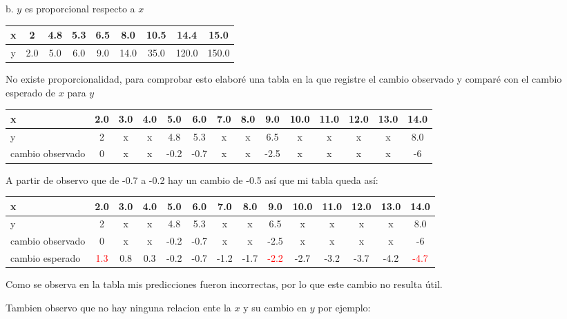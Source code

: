 \documentclass[12pt, letterpaper]{article}
\begin{document}
\newpage
b. $y$ es proporcional respecto a $x$

\begin{tabular}{c|c|c|c|c|c|c|c|c}
x & 2 & 4.8 & 5.3 & 6.5 & 8.0 & 10.5 & 14.4 & 15.0\\
\hline
y & 2.0 & 5.0 & 6.0 & 9.0 & 14.0 & 35.0 & 120.0 & 150.0 
\end{tabular}

No existe proporcionalidad, para comprobar esto elaboré una tabla en la que registre el cambio observado y comparé con el cambio esperado de $x$ para $y$
\newpage
\begin{table}[htb]
\centering
\begin{tabular}{|p{1.2cm}|c|c|c|c|c|c|c|c|c|c|c|c|c|}
\hline
x & 2.0 & 3.0 & 4.0 & 5.0 & 6.0 & 7.0 & 8.0 & 9.0 & 10.0 & 11.0 & 12.0 & 13.0 & 14.0\\
\hline
y & 2    & x   &  x   & 4.8 & 5.3 &   x &    x & 6.5 &   x   &  x    &  x    &   x    & 8.0\\
\hline
cambio observado & 0    & x   &  x   & -0.2 & -0.7 &   x &    x & -2.5 &   x   &  x    &  x    &   x    & -6\\
\hline
\end{tabular}
\end{table}
A partir de observo que de -0.7 a -0.2 hay un cambio de -0.5 así que mi  tabla queda así:

\begin{table}[htb]
\centering
\begin{tabular}{|p{1.2cm}|c|c|c|c|c|c|c|c|c|c|c|c|c|}
\hline
x & 2.0 & 3.0 & 4.0 & 5.0 & 6.0 & 7.0 & 8.0 & 9.0 & 10.0 & 11.0 & 12.0 & 13.0 & 14.0\\
\hline
y & 2    & x   &  x   & 4.8 & 5.3 &   x &    x & 6.5 &   x   &  x    &  x    &   x    & 8.0\\
\hline
cambio observado & 0    & x   &  x   & -0.2 & -0.7 &   x &    x & -2.5 &   x   &  x    &  x    &   x    & -6\\
\hline
cambio esperado & \textcolor{red}{1.3} & 0.8  &  0.3   & -0.2 & -0.7 &  -1.2 &    -1.7 & \textcolor{red}{-2.2} &   -2.7   &  -3.2    &  -3.7    &   -4.2    & \textcolor{red}{-4.7}\\
\hline
\end{tabular}
\end{table}

Como se observa en la tabla mis predicciones fueron incorrectas, por lo que este cambio no resulta útil.

Tambien observo que no hay ninguna relacion ente la $x$ y su cambio en $y$ por ejemplo:
\end{document}
